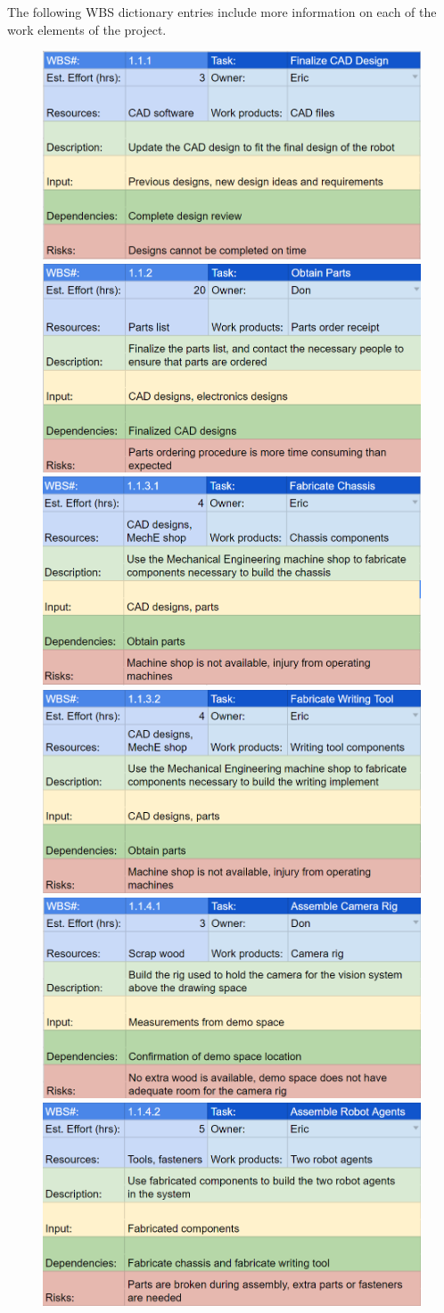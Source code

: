 The following WBS dictionary entries include more information on each of the work elements of the project. 

\begin{figure}[h!]
\centering
\includegraphics[width=0.49\columnwidth]{wbs_schedule/wbs_dict_hw1.PNG}
\includegraphics[width=0.49\columnwidth]{wbs_schedule/wbs_dict_hw2.PNG}
\includegraphics[width=0.49\columnwidth]{wbs_schedule/wbs_dict_hw3.PNG}
\includegraphics[width=0.49\columnwidth]{wbs_schedule/wbs_dict_hw4.PNG}
\includegraphics[width=0.49\columnwidth]{wbs_schedule/wbs_dict_hw5.PNG}
\includegraphics[width=0.49\columnwidth]{wbs_schedule/wbs_dict_hw6.PNG}

\end{figure}

